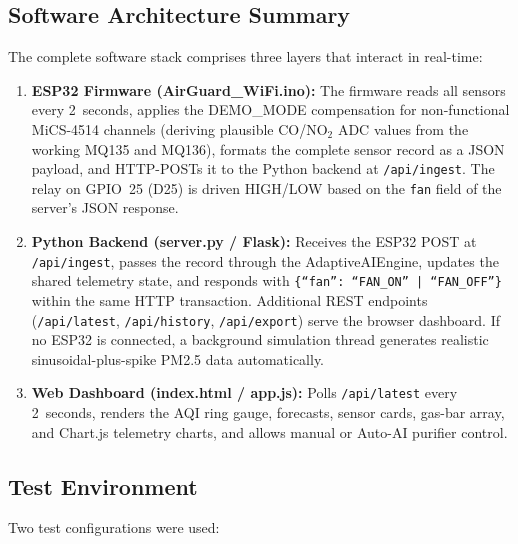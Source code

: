 \FloatBarrier

\subsection{Software Architecture Summary}
\label{sec:exp-software-summary}

The complete software stack comprises three layers that interact in real-time:

\begin{enumerate}
    \item \textbf{ESP32 Firmware (AirGuard\_WiFi.ino):} The firmware reads all sensors every 2~seconds, applies the DEMO\_MODE compensation for non-functional MiCS-4514 channels (deriving plausible CO/NO$_2$ ADC values from the working MQ135 and MQ136), formats the complete sensor record as a JSON payload, and HTTP-POSTs it to the Python backend at \texttt{/api/ingest}. The relay on GPIO~25 (D25) is driven HIGH/LOW based on the \texttt{fan} field of the server's JSON response.
    \item \textbf{Python Backend (server.py / Flask):} Receives the ESP32 POST at \texttt{/api/ingest}, passes the record through the AdaptiveAIEngine, updates the shared telemetry state, and responds with \texttt{\{``fan'': ``FAN\_ON'' | ``FAN\_OFF''\}} within the same HTTP transaction. Additional REST endpoints (\texttt{/api/latest}, \texttt{/api/history}, \texttt{/api/export}) serve the browser dashboard. If no ESP32 is connected, a background simulation thread generates realistic sinusoidal-plus-spike PM2.5 data automatically.
    \item \textbf{Web Dashboard (index.html / app.js):} Polls \texttt{/api/latest} every 2~seconds, renders the AQI ring gauge, forecasts, sensor cards, gas-bar array, and Chart.js telemetry charts, and allows manual or Auto-AI purifier control.
\end{enumerate}

\subsection{Test Environment}
\label{sec:exp-environment}

Two test configurations were used:

